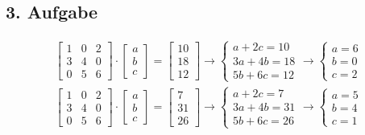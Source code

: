 \documentclass[fleqn,draft,a5paper]{article}
\theoremstyle{remark}
\begin{document}
\subsection{3. Aufgabe}
\begin{multline*}
  \begin{bmatrix}
    1 & 0 & 2 \\
    3 & 4 & 0 \\
    0 & 5 & 6
  \end{bmatrix}
  \cdot
  \begin{bmatrix}
    a \\ b \\ c
  \end{bmatrix}
  =
  \begin{bmatrix}
    10 \\ 18 \\ 12
  \end{bmatrix} \to
  \begin{cases}
    a + 2c = 10 \\
    3a + 4b = 18 \\
    5b + 6c = 12
  \end{cases} \to
  \begin{cases}
    a = 6 \\ b = 0 \\ c = 2
  \end{cases}
  \\
  \begin{bmatrix}
    1 & 0 & 2 \\
    3 & 4 & 0 \\
    0 & 5 & 6
  \end{bmatrix}
  \cdot
  \begin{bmatrix}
    a \\ b \\ c
  \end{bmatrix}
  =
  \begin{bmatrix}
    7 \\ 31 \\ 26
  \end{bmatrix} \to
  \begin{cases}
    a + 2c = 7 \\
    3a + 4b = 31 \\
    5b + 6c = 26
  \end{cases} \to
  \begin{cases}
    a = 5 \\ b = 4 \\ c = 1
  \end{cases}
  \\

\end{multline*}
\end{document}
